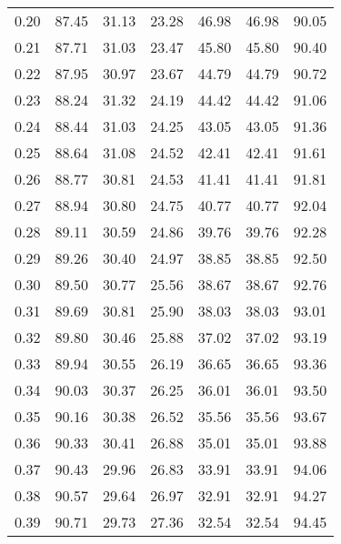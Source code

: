 \begin{tabular}{|c|c|c|c|c|c|c|}
      0.20 &     87.45 &     31.13 &      23.28 &   46.98 &      46.98 &         90.05 \\
      0.21 &     87.71 &     31.03 &      23.47 &   45.80 &      45.80 &         90.40 \\
      0.22 &     87.95 &     30.97 &      23.67 &   44.79 &      44.79 &         90.72 \\
      0.23 &     88.24 &     31.32 &      24.19 &   44.42 &      44.42 &         91.06 \\
      0.24 &     88.44 &     31.03 &      24.25 &   43.05 &      43.05 &         91.36 \\
      0.25 &     88.64 &     31.08 &      24.52 &   42.41 &      42.41 &         91.61 \\
      0.26 &     88.77 &     30.81 &      24.53 &   41.41 &      41.41 &         91.81 \\
      0.27 &     88.94 &     30.80 &      24.75 &   40.77 &      40.77 &         92.04 \\
      0.28 &     89.11 &     30.59 &      24.86 &   39.76 &      39.76 &         92.28 \\
      0.29 &     89.26 &     30.40 &      24.97 &   38.85 &      38.85 &         92.50 \\
      0.30 &     89.50 &     30.77 &      25.56 &   38.67 &      38.67 &         92.76 \\
      0.31 &     89.69 &     30.81 &      25.90 &   38.03 &      38.03 &         93.01 \\
      0.32 &     89.80 &     30.46 &      25.88 &   37.02 &      37.02 &         93.19 \\
      0.33 &     89.94 &     30.55 &      26.19 &   36.65 &      36.65 &         93.36 \\
      0.34 &     90.03 &     30.37 &      26.25 &   36.01 &      36.01 &         93.50 \\
      0.35 &     90.16 &     30.38 &      26.52 &   35.56 &      35.56 &         93.67 \\
      0.36 &     90.33 &     30.41 &      26.88 &   35.01 &      35.01 &         93.88 \\
      0.37 &     90.43 &     29.96 &      26.83 &   33.91 &      33.91 &         94.06 \\
      0.38 &     90.57 &     29.64 &      26.97 &   32.91 &      32.91 &         94.27 \\
      0.39 &     90.71 &     29.73 &      27.36 &   32.54 &      32.54 &         94.45 \\

\end{tabular}
